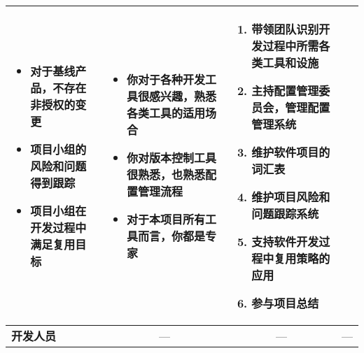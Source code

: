 \begin{spacing}{1.2}
\begin{longtable}{|m{1.5cm}<{\centering}|m{4.2cm}|m{4.2cm}|m{4.2cm}|}
\begin{itemize}[leftmargin=1.3em]
            \item 对于基线产品，不存在非授权的变更
            \item 项目小组的风险和问题得到跟踪
            \item 项目小组在开发过程中满足复用目标
            \vspace{-1.3em}
        \end{itemize} &
        \vspace{-1.1em}
        \begin{itemize}[leftmargin=1.3em]
            \item 你对于各种开发工具很感兴趣，熟悉各类工具的适用场合
            \item 你对版本控制工具很熟悉，也熟悉配置管理流程
            \item 对于本项目所有工具而言，你都是专家
            \vspace{-1.3em}
        \end{itemize} &
        \vspace{-1.1em}
        \begin{enumerate}[label=\arabic*.,leftmargin=1.5em]
            \item 带领团队识别开发过程中所需各类工具和设施
            \item 主持配置管理委员会，管理配置管理系统
            \item 维护软件项目的词汇表
            \item 维护项目风险和问题跟踪系统
            \item 支持软件开发过程中复用策略的应用
            \item 参与项目总结
            \vspace{-1.3em}
        \end{enumerate}\\ \hline
        \textbf{开发人员} & \multicolumn{1}{c|}{—} & \multicolumn{1}{c|}{—} & \multicolumn{1}{c|}{—} \\ \hline
    \end{longtable}
\end{spacing}
\vspace{-1em}
